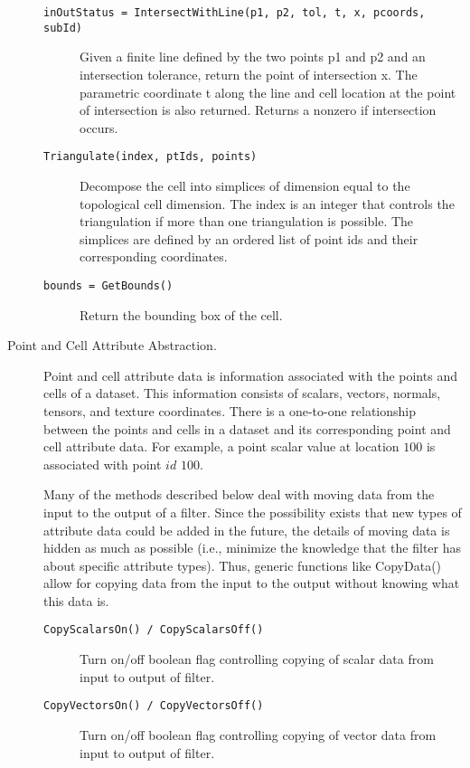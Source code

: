 \begin{description}
\begin{description}
    \item[\texttt{inOutStatus = IntersectWithLine(p1, p2, tol, t, x, pcoords, subId)}] 
    Given a finite line defined by the two points p1 and p2 and an intersection tolerance, return the point of intersection x. The parametric coordinate t along the line and cell location at the point of intersection is also returned. Returns a nonzero if intersection occurs.

    \item[\texttt{Triangulate(index, ptIds, points)}]
    Decompose the cell into simplices of dimension equal to the topological cell dimension. The index is an integer that controls the triangulation if more than one triangulation  is possible. The simplices are defined by an ordered list of point ids and their corresponding coordinates.

    \item[\texttt{bounds = GetBounds()}]
    Return the bounding box of the cell.

    \end{description}
\item[Point and Cell Attribute Abstraction.\index{abstraction!dataset attribute|(}] Point and cell attribute data is information associated with the points and cells of a dataset. This information consists of scalars, vectors, normals, tensors, and texture coordinates. There is a one-to-one relationship between the points and cells in a dataset and its corresponding point and cell attribute data. For example, a point scalar value at location $100$ is associated with point $id$ $100$.

Many of the methods described below deal with moving data from the input to the output of a filter. Since the possibility exists that new types of attribute data could be added in the future, the details of moving data is hidden as much as possible (i.e., minimize the knowledge that the filter has about specific attribute types). Thus, generic functions like CopyData() allow for copying data from the input to the output without knowing what this data is.
    \begin{description}

    \item[\texttt{CopyScalarsOn() / CopyScalarsOff()}]
    Turn on/off boolean flag controlling copying of scalar data from input to output of filter.

    \item[\texttt{CopyVectorsOn() / CopyVectorsOff()}]
    Turn on/off boolean flag controlling copying of vector data from input to output of filter.


\end{description}
\end{description}

